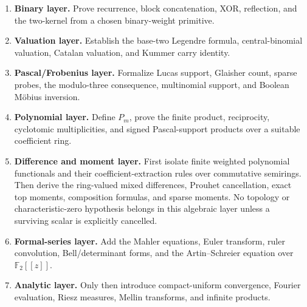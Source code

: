 \documentclass[11pt,oneside]{article}
\numberwithin{equation}{section}
\theoremstyle{definition}
\theoremstyle{remark}
\newcommand{\Ftwo}{\mathbb F_2}
\begin{document}
\begin{enumerate}
\item \textbf{Binary layer.}  Prove recurrence, block concatenation, XOR,
      reflection, and the two-kernel from a chosen binary-weight primitive.
\item \textbf{Valuation layer.}  Establish the base-two Legendre formula,
      central-binomial valuation, Catalan valuation, and Kummer carry identity.
\item \textbf{Pascal/Frobenius layer.}  Formalize Lucas support, Glaisher count,
      sparse probes, the modulo-three consequence, multinomial support, and
      Boolean M\"obius inversion.
\item \textbf{Polynomial layer.}  Define \(P_m\), prove the finite product,
      reciprocity, cyclotomic multiplicities, and signed Pascal-support
      products over a suitable coefficient ring.
\item \textbf{Difference and moment layer.}  First isolate finite weighted
      polynomial functionals and their coefficient-extraction rules over
      commutative semirings.  Then derive the ring-valued mixed differences,
      Prouhet cancellation, exact top moments, composition formulas, and sparse
      moments.  No topology or characteristic-zero hypothesis belongs in this
      algebraic layer unless a surviving scalar is explicitly cancelled.
\item \textbf{Formal-series layer.}  Add the Mahler equations, Euler transform,
      ruler convolution, Bell/determinant forms, and the Artin--Schreier
      equation over \(\Ftwo[[z]]\).
\item \textbf{Analytic layer.}  Only then introduce compact-uniform convergence,
      Fourier evaluation, Riesz measures, Mellin transforms, and infinite
      products.
\end{enumerate}
\end{document}
